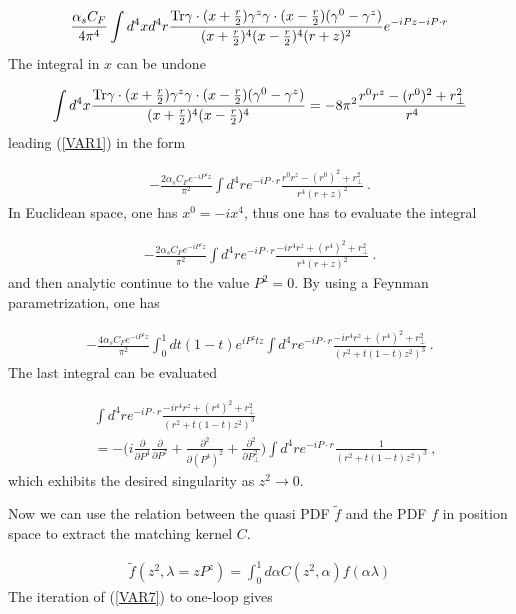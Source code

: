 \documentclass[11pt,aps,amsmath,amssymb,nofootinbib,notitlepage,longbibliography]{revtex4-1}
\begin{document}
\begin{align}
\label{VAR1}
\frac{\alpha_sC_F}{4\pi^4}\int d^4x d^4r\frac{{\rm Tr}\gamma \cdot(x+\frac{r}{2})\gamma^z\gamma\cdot(x-\frac{r}{2})(\gamma^0-\gamma^z)}{(x+\frac{r}{2})^4(x-\frac{r}{2})^4(r+z)^2} e^{-iPz-iP\cdot r}
\end{align}
The integral in $x$ can be undone

\begin{align}
\label{VAR2}
\int d^4x \frac{{\rm Tr}\gamma \cdot(x+\frac{r}{2})\gamma^z\gamma\cdot(x-\frac{r}{2})(\gamma^0-\gamma^z)}{(x+\frac{r}{2})^4(x-\frac{r}{2})^4}=-8\pi^2\frac{r^0r^z-(r^0)^2+r_\perp^2}{r^4}
\end{align}
leading (\ref{VAR1}) in the form

\begin{align}
\label{VAR3}
-\frac{2\alpha_sC_Fe^{-iP^zz}}{\pi^2}\int d^4re^{-iP\cdot r}\frac{r^0r^z-(r^0)^2+r_\perp^2}{r^4(r+z)^2} \ .
\end{align}
In Euclidean space, one has $x^0=-ix^4$, thus one has to evaluate the integral

\begin{align}
\label{VAR4}
-\frac{2\alpha_sC_Fe^{-iP^zz}}{\pi^2}\int d^4re^{-iP\cdot r}\frac{-ir^4r^z+(r^4)^2+r_\perp^2}{r^4(r+z)^2} \ .
\end{align}
and then analytic continue to the value $P^2=0$. By using a Feynman parametrization, one has

\begin{align}
\label{VAR5}
-\frac{4\alpha_sC_Fe^{-iP^zz}}{\pi^2}\int_{0}^1 dt(1-t)e^{iP^ztz}\int d^4r e^{-iP\cdot r}\frac{-ir^4r^z+(r^4)^2+r_\perp^2}{(r^2+t(1-t)z^2)^3} \ .
\end{align}
The last integral can be evaluated

\begin{align}
\label{VAR6}
&\int d^4r e^{-iP\cdot r}\frac{-ir^4r^z+(r^4)^2+r_\perp^2}{(r^2+t(1-t)z^2)^3}\nonumber \\
&=-\bigg(i\frac{\partial}{\partial P^4}\frac{\partial}{\partial P^z}+\frac{\partial^2}{\partial (P^4)^2}+\frac{\partial^2}{\partial P_\perp^2}\bigg)\int d^4r e^{-iP\cdot r}\frac{1}{(r^2+t(1-t)z^2)^3} \ ,
\end{align}
which exhibits the desired singularity as $z^2\rightarrow 0$.


Now we can use the relation between the quasi PDF $\tilde f$ and the PDF $f$ in position space to extract the matching kernel $C$.

\begin{align}
\label{VAR7}
\tilde f(z^2,\lambda=zP^z)=\int_{0}^1 d\alpha C(z^2,\alpha)f(\alpha\lambda)
\end{align}
The iteration of (\ref{VAR7}) to one-loop gives
\end{document}
